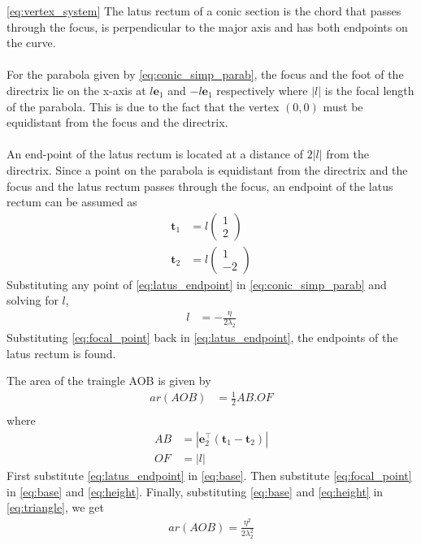 \documentclass[journal,10pt,twocolumn]{article}
\providecommand{\abs}[1]{\left\vert#1\right\vert}
\let\vec\mathbf
\newcommand{\myvec}[1]{\ensuremath{\begin{pmatrix}#1\end{pmatrix}}}
\begin{document}
\eqref{eq:vertex_system}
The latus rectum of a conic section is the chord that passes through the focus, is perpendicular to the major axis and has both endpoints on the curve.\\\\For the parabola given by \eqref{eq:conic_simp_parab}, the focus and the foot of the directrix lie on the x-axis at  $l\vec{e}_1$ and $-l\vec{e}_1$ respectively where $\abs{l}$ is the focal length of the parabola. This is due to the fact that the vertex $(0,0)$ must be equidistant from the focus and the directrix.\\\\An end-point of the latus rectum is located at a distance of $2\abs{l}$ from the directrix. Since a point on the parabola is equidistant from the directrix and the focus and the latus rectum passes through the focus, an endpoint of the latus rectum can be assumed as
\begin{equation}
\begin{aligned}
	\vec{t}_1 &= l\myvec{1 \\ 2}\\
	\vec{t}_2 &= l\myvec{1 \\ -2}
\end{aligned}
	\label{eq:latus_endpoint}
\end{equation}
Substituting any point of \eqref{eq:latus_endpoint} in \eqref{eq:conic_simp_parab} and solving for $l$,
\begin{align}
	l &= -\frac{\eta}{2\lambda_2}
	\label{eq:focal_point}
\end{align}
Substituting \eqref{eq:focal_point} back in \eqref{eq:latus_endpoint}, the endpoints of the latus rectum is found.

The area of the traingle AOB is given by
\begin{align}
	ar(AOB) &= \frac{1}{2}AB.OF\\
	\label{eq:triangle}
\end{align}
where
\begin{align}
	\label{eq:base}
	AB &= \abs{\vec{e}_2^{\top}(\vec{t}_1-\vec{t}_2)}\\
	\label{eq:height}
	OF &= \abs{l}
\end{align}
First substitute \eqref{eq:latus_endpoint} in \eqref{eq:base}. Then substitute \eqref{eq:focal_point} in \eqref{eq:base} and \eqref{eq:height}. Finally, substituting \eqref{eq:base} and \eqref{eq:height} in \eqref{eq:triangle}, we get
\begin{align}
	ar(AOB) = \frac{\eta^2}{2\lambda_2^2}
\end{align}
\end{document}
